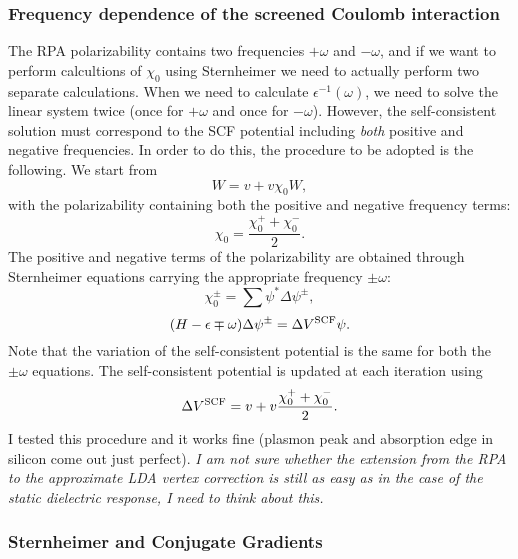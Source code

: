 \documentclass[12pt]{article}
\begin{document}
\subsubsection*{Frequency dependence of the screened Coulomb interaction}

The RPA polarizability contains two frequencies $+\omega$ and $-\omega$, and if
we want to perform calcultions of $\chi_0$ using Sternheimer we need to actually
perform two separate calculations.
When we need to calculate $\epsilon^{-1}(\omega)$, we need to solve the linear system
twice (once for $+\omega$ and once for $-\omega$). However, the self-consistent
solution must correspond to the SCF potential including {\it both} positive and negative
frequencies. In order to do this, the procedure to be adopted is the following.
We start from
  \begin{equation}
  W = v + v \chi_0 W, 
  \end{equation}
with the polarizability containing both the positive and negative frequency terms:
  \begin{equation}
  \chi_0 = \frac{\chi_0^+ + \chi_0^-}{2}.
  \end{equation}
The positive and negative terms of the polarizability are obtained through Sternheimer
equations carrying the appropriate frequency $\pm \omega$:
  \begin{equation}
  \chi_0^\pm = \sum \psi^* \Delta \psi^\pm,
  \end{equation}
  \begin{equation}
  (H-\epsilon \mp \omega) \Delta \psi^\pm = \Delta V^{\rm SCF} \psi.
  \end{equation}
Note that the variation of the self-consistent potential is the same for
both the $\pm \omega$ equations. 
The self-consistent potential is updated at each iteration using 
  \begin{equation}
  \Delta V^{\rm SCF} = v + v\frac{\chi_0^+ + \chi_0^-}{2}.
  \end{equation}
I tested this procedure and it works fine (plasmon peak and absorption edge 
in silicon come out just perfect). {\it I am not sure whether the extension from the RPA
to the approximate LDA vertex correction is still as easy as in the case of the
static dielectric response, I need to think about this.}

\subsubsection*{Sternheimer and Conjugate Gradients}
\end{document}
